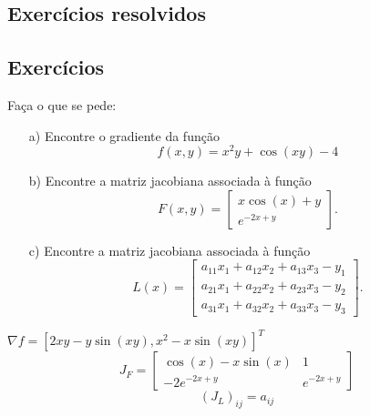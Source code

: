 
\fi

\subsection*{Exercícios resolvidos}

\construirExeresol

\subsection*{Exercícios}

\begin{exer} Faça o que se pede:
\begin{itemize}
\item[a)] Encontre o gradiente da função \begin{equation} f(x,y)=x^2y+\cos(xy)-4 \end{equation}
\item[b)] Encontre a matriz jacobiana associada à função
\begin{equation} F(x,y)=\left[\begin{array}{c}x\cos(x)+y\\ e^{-2x+y}\end{array} \right]. \end{equation}
\item[c)] Encontre a matriz jacobiana associada à função
\begin{equation}L(x)=\left[\begin{array}{c}
a_{11}x_1 + a_{12}x_2 +a_{13}x_3-y_1\\
a_{21}x_1 + a_{22}x_2 +a_{23}x_3-y_2\\
a_{31}x_1 + a_{32}x_2 +a_{33}x_3-y_3
\end{array}
 \right].\end{equation}
\end{itemize}
\end{exer}
\begin{resp}
$\nabla f = [2xy-y\sin(xy), x^2-x\sin(xy)]^T$
\begin{equation}J_F=\left[\begin{array}{cc}
\cos(x)-x\sin(x) & 1\\
-2e^{-2x+y} &e^{-2x+y}
\end{array}
\right]\end{equation}
\begin{equation} \left(J_L\right)_{ij}=a_{ij} \end{equation}
\end{resp}

